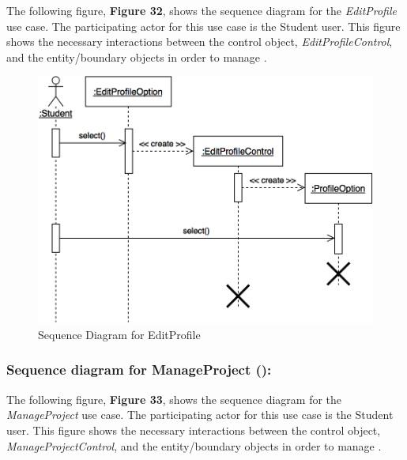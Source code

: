 \documentclass[12pt,letterpaper]{article}
\begin{document}
The following figure, {\bf Figure 32}, shows the sequence diagram for the {\it EditProfile} use case. The participating actor for this use case is the 
Student user. This figure shows the necessary interactions between the control object, {\it EditProfileControl}, and the entity/boundary objects
in order to manage \editprofile{}.

\begin{figure}[H]
	\centering{}
	\includegraphics[scale=0.3]{imgs/seq/edit-profile.png}
	\caption{Sequence Diagram for EditProfile}
\end{figure}

\subsubsection*{Sequence diagram for ManageProject (\manageproject{}):}

The following figure, {\bf Figure 33}, shows the sequence diagram for the {\it ManageProject} use case. The participating actor for this use case is the
Student user. This figure shows the necessary interactions between the control object, {\it ManageProjectControl}, and the entity/boundary objects 
in order to manage \manageproject{}.
\end{document}
